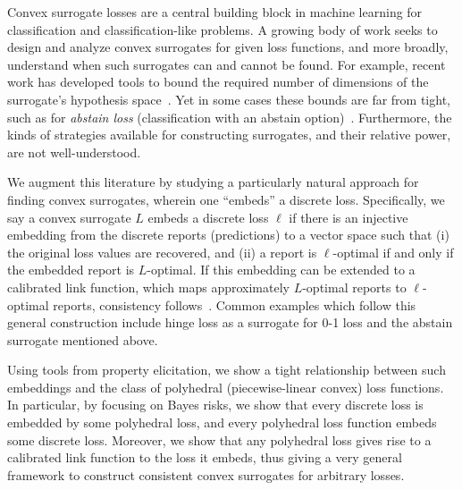 \documentclass[12pt]{article}
\newcommand{\Comments}{1}
\newcommand{\mynote}[2]{\ifnum\Comments=1\textcolor{#1}{#2}\fi}
\newcommand{\raf}[1]{\mynote{green}{[RF: #1]}}
\newcommand{\reals}{\mathbb{R}}
\newcommand{\R}{\mathcal{R}}
\begin{document}
%

Convex surrogate losses are a central building block in machine learning for classification and classification-like problems.
A growing body of work seeks to design and analyze convex surrogates for given loss functions, and more broadly, understand when such surrogates can and cannot be found.
For example, recent work has developed tools to bound the required number of dimensions of the surrogate's hypothesis space~\cite{frongillo2015elicitation,  ramaswamy2016convex}.
Yet in some cases these bounds are far from tight, such as for \emph{abstain loss} (classification with an abstain option)~\cite{bartlett2008classification, yuan2010classification, ramaswamy2016convex, ramaswamy2018consistent, zhang2018reject}.
Furthermore, the kinds of strategies available for constructing surrogates, and their relative power, are not well-understood.

We augment this literature by studying a particularly natural approach for finding convex surrogates, wherein one ``embeds'' a discrete loss.
Specifically, we say a convex surrogate $L$ embeds a discrete loss $\ell$ if there is an injective embedding from the discrete reports (predictions) to a vector space such that (i) the original loss values are recovered, and (ii) a report is $\ell$-optimal if and only if the embedded report is $L$-optimal.
If this embedding can be extended to a calibrated link function, which maps approximately $L$-optimal reports to $\ell$-optimal reports, consistency follows~\cite{agarwal2015consistent}.
Common examples which follow this general construction include hinge loss as a surrogate for 0-1 loss and the abstain surrogate mentioned above.

Using tools from property elicitation, we show a tight relationship between such embeddings and the class of polyhedral (piecewise-linear convex) loss functions.
In particular, by focusing on Bayes risks, we show that every discrete loss is embedded by some polyhedral loss, and every polyhedral loss function embeds some discrete loss.
Moreover, we show that any polyhedral loss gives rise to a calibrated link function to the loss it embeds,
thus giving a very general framework to construct consistent convex surrogates for arbitrary losses.
\end{document}
